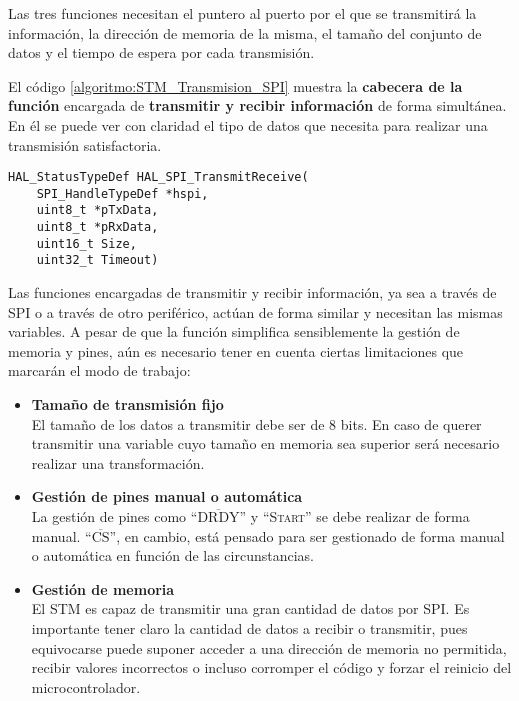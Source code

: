 Las tres funciones necesitan el puntero al puerto por el que se transmitirá la información, la dirección de memoria de la misma, el tamaño del conjunto de datos y el tiempo de espera por cada transmisión.

El código \ref{algoritmo:STM_Transmision_SPI} muestra la \textbf{cabecera de la función} encargada de \textbf{transmitir y recibir información} de forma simultánea. En él se puede ver con claridad el tipo de datos que necesita para realizar una transmisión satisfactoria.

\begin{lstlisting}[label=algoritmo:STM_Transmision_SPI,style = STM-code,frame=single,caption=Transmisión de datos a través de SPI con el STM]
HAL_StatusTypeDef HAL_SPI_TransmitReceive(
	SPI_HandleTypeDef *hspi,
 	uint8_t *pTxData, 
 	uint8_t *pRxData, 
 	uint16_t Size, 
	uint32_t Timeout)
\end{lstlisting}

Las funciones encargadas de transmitir y recibir información, ya sea a través de \acrshort{SPI} o a través de otro periférico, actúan de forma similar y necesitan las mismas variables. A pesar de que la función simplifica sensiblemente la gestión de memoria y pines, aún es necesario tener en cuenta ciertas limitaciones que marcarán el modo de trabajo:
\begin{itemize}
\item \textbf{Tamaño de transmisión fijo}\\
El tamaño de los datos a transmitir debe ser de 8 bits. En caso de querer transmitir una variable cuyo tamaño en memoria sea superior será necesario realizar una transformación.
\item \textbf{Gestión de pines manual o automática}\\
La gestión de pines como ``$\overline{\text{DRDY}}$'' y ``\textsc{Start}'' se debe realizar de forma manual. ``$\overline{\text{CS}}$'', en cambio, está pensado para ser gestionado de forma manual o automática en función de las circunstancias.
\item \textbf{Gestión de memoria}\\
El STM es capaz de transmitir una gran cantidad de datos por \acrshort{SPI}. Es importante tener claro la cantidad de datos a recibir o transmitir, pues equivocarse puede suponer acceder a una dirección de memoria no permitida, recibir valores incorrectos o incluso corromper el código y forzar el reinicio del microcontrolador.
\end{itemize}

